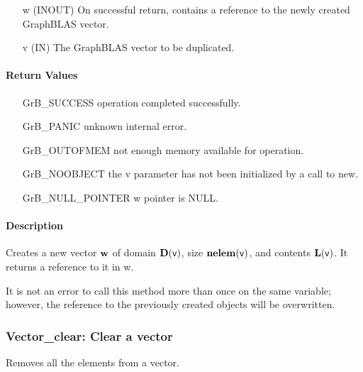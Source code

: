 \begin{itemize}[leftmargin=1.1in]
    \item[{\sf w}]  ({\sf INOUT}) On successful return, contains a reference
                                  to the newly created GraphBLAS vector.
    \item[{\sf v}]  ({\sf IN})    The GraphBLAS vector to be duplicated.
\end{itemize}

\paragraph{Return Values}

\begin{itemize}[leftmargin=2.1in]
\item[{\sf GrB\_SUCCESS}]    operation completed successfully.
\item[{\sf GrB\_PANIC}]      unknown internal error.
\item[{\sf GrB\_OUTOFMEM}]   not enough memory available for operation.
\item[{\sf GrB\_NOOBJECT}]   the {\sf v} parameter has not been initialized
                             by a call to {\sf new}.
\item[{\sf GrB\_NULL\_POINTER}]    {\sf w} pointer is {\sf NULL}.
\end{itemize}

\paragraph{Description}

Creates a new vector ${\bf w}$ of domain $\bold{D}({\sf v})$, size 
$\bold{nelem}({\sf v})$, and contents $\bold{L}({\sf v})$. It returns a 
reference to it in {\sf w}.

It is not an error to call this method more than once on the same variable;  
however, the reference to the previously created objects will be overwritten. 

\subsubsection{{\sf Vector\_clear}: Clear a vector}

Removes all the elements from a vector.

